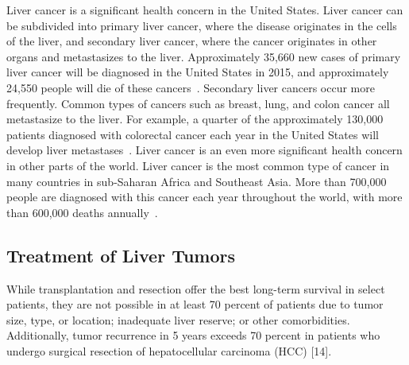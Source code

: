 Liver cancer is a significant health concern in the United States. Liver cancer can be subdivided into primary liver cancer, where the disease originates in the cells of the liver, and secondary liver cancer, where the cancer originates in other organs and metastasizes to the liver. Approximately 35,660 new cases of primary liver cancer will be diagnosed in the United States in 2015, and approximately 24,550 people will die of these cancers~\cite{AmericanCancer2015}. Secondary liver cancers occur more frequently. Common types of cancers such as breast, lung, and colon cancer all metastasize to the liver. For example, a quarter of the approximately 130,000 patients diagnosed with colorectal cancer each year in the United States will develop liver metastases~\cite{Ananthakrishnan2006,CDC2015,Haddad2011}. Liver cancer is an even more significant health concern in other parts of the world. Liver cancer is the most common type of cancer in many countries in sub-Saharan Africa and Southeast Asia. More than 700,000 people are diagnosed with this cancer each year throughout the world, with more than 600,000 deaths annually~\cite{AmericanCancer2015}.

\subsection{Treatment of Liver Tumors}
While transplantation and resection offer the best long-term survival in select patients, they are not possible in at least 70 percent of patients due to tumor size, type, or location; inadequate liver reserve; or other comorbidities. Additionally, tumor recurrence in 5 years exceeds 70 percent in patients who undergo surgical resection of hepatocellular carcinoma (HCC) [14]. 



